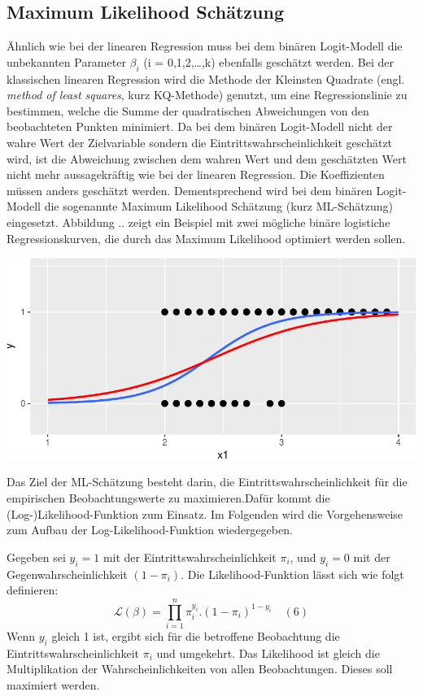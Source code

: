 \documentclass[12pt,]{article}
\begin{document}
\subsection{Maximum Likelihood
Schätzung}\label{maximum-likelihood-schatzung}

Ähnlich wie bei der linearen Regression muss bei dem binären
Logit-Modell die unbekannten Parameter \(\beta_i\) (i =
0,1,2,\ldots{},k) ebenfalls geschätzt werden. Bei der klassischen
linearen Regression wird die Methode der Kleinsten Quadrate (engl.
\emph{method of least squares}, kurz KQ-Methode) genutzt, um eine
Regressionslinie zu bestimmen, welche die Summe der quadratischen
Abweichungen von den beobachteten Punkten minimiert. Da bei dem binären
Logit-Modell nicht der wahre Wert der Zielvariable sondern die
Eintrittswahrscheinlichkeit geschätzt wird, ist die Abweichung zwischen
dem wahren Wert und dem geschätzten Wert nicht mehr aussagekräftig wie
bei der linearen Regression. Die Koeffizienten müssen anders geschätzt
werden. Dementsprechend wird bei dem binären Logit-Modell die sogenannte
Maximum Likelihood Schätzung (kurz ML-Schätzung) eingesetzt. Abbildung
.. zeigt ein Beispiel mit zwei mögliche binäre logistiche
Regressionskurven, die durch das Maximum Likelihood optimiert werden
sollen.

\includegraphics{logisticRegression_files/figure-latex/unnamed-chunk-2-1.pdf}

Das Ziel der ML-Schätzung besteht darin, die Eintrittswahrscheinlichkeit
für die empirischen Beobachtungswerte zu maximieren.Dafür kommt die
(Log-)Likelihood-Funktion zum Einsatz. Im Folgenden wird die
Vorgehensweise zum Aufbau der Log-Likelihood-Funktion wiedergegeben.

Gegeben sei \(y_i = 1\) mit der Eintrittswahrscheinlichkeit \(\pi_i\),
und \(y_i = 0\) mit der Gegenwahrscheinlichkeit \((1-\pi_i)\). Die
Likelihood-Funktion lässt sich wie folgt definieren: \[
\mathcal{L}(\beta) = {\prod_{i=1}^{n} \pi_i^{y_i}.(1-\pi_i)^{1-y_i}} \quad (6)
\] Wenn \(y_i\) gleich 1 ist, ergibt sich für die betroffene Beobachtung
die Eintrittswahrscheinlichkeit \(\pi_i\) und umgekehrt. Das Likelihood
ist gleich die Multiplikation der Wahrscheinlichkeiten von allen
Beobachtungen. Dieses soll maximiert werden.
\end{document}
